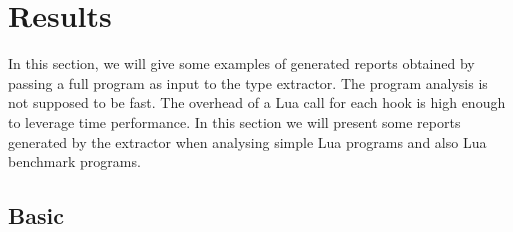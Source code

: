 \chapter{Results}
\label{cha:Results}
In this section, we will give some examples of generated reports obtained by passing a full program as input to the type extractor. The program analysis is not supposed to be fast. The overhead of a Lua call for each hook is high enough to leverage time performance. In this section we will present some reports generated by the extractor when analysing simple Lua programs and also Lua benchmark programs.

\section*{Basic}


\section*{}
% 